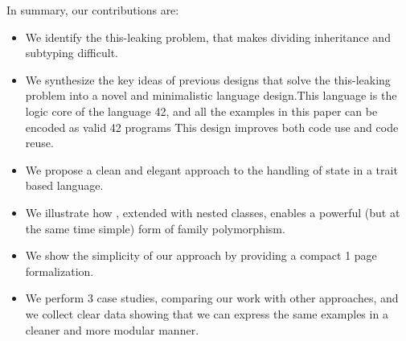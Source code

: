 In summary, our contributions are:







\begin{itemize}
\item We identify the this-leaking problem, that makes dividing inheritance and subtyping difficult.

\item We synthesize the key ideas of previous designs that solve the
  this-leaking problem into a novel and
  minimalistic language design.This language is the logic core of the language 42, and 
  all the examples in this paper can be encoded as valid 42 programs
This design improves both code use and code reuse.

\item We propose a clean and elegant approach to the handling of state in a trait based language.

\item We illustrate how \name, extended with nested classes, enables a
  powerful (but at the same time simple) form of family polymorphism. %
\item We show the simplicity of our approach by providing a compact 1 page formalization.
\item We perform 3 case studies, comparing our work with other
  approaches, and we collect clear data showing that we can express the same examples in a cleaner and more modular manner.
\end{itemize}
\saveSpace
\saveSpace

